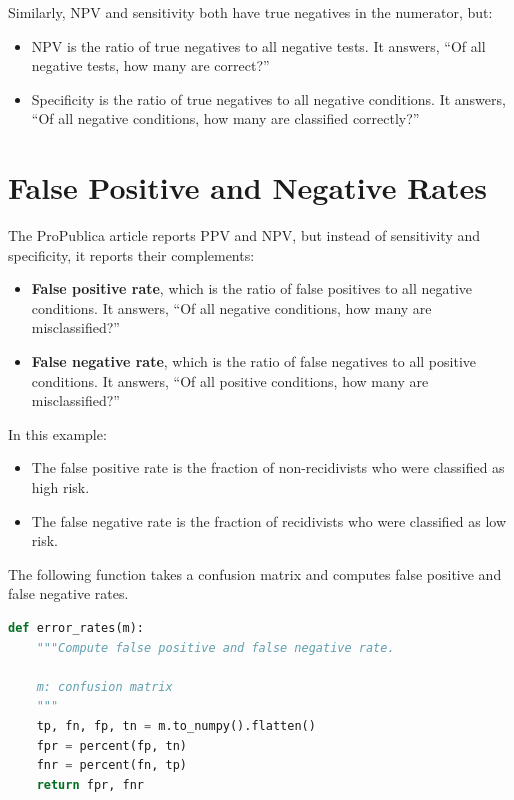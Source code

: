 Similarly, NPV and sensitivity both have true negatives in the
numerator, but:

\begin{itemize}
\item
  NPV is the ratio of true negatives to all negative tests. It answers,
  ``Of all negative tests, how many are correct?''
\item
  Specificity is the ratio of true negatives to all negative conditions.
  It answers, ``Of all negative conditions, how many are classified
  correctly?''
\end{itemize}

\section{False Positive and Negative
Rates}\label{false-positive-and-negative-rates}

The ProPublica article reports PPV and NPV, but instead of sensitivity
and specificity, it reports their complements:

\begin{itemize}
\item
  \textbf{False positive rate}, which is the ratio of false positives to
  all negative conditions. It answers, ``Of all negative conditions, how
  many are misclassified?''
\item
  \textbf{False negative rate}, which is the ratio of false negatives to
  all positive conditions. It answers, ``Of all positive conditions, how
  many are misclassified?''
\end{itemize}

In this example:

\begin{itemize}
\item
  The false positive rate is the fraction of non-recidivists who were
  classified as high risk.
\item
  The false negative rate is the fraction of recidivists who were
  classified as low risk.
\end{itemize}

The following function takes a confusion matrix and computes false
positive and false negative rates.

\begin{lstlisting}[language=Python,style=source]
def error_rates(m):
    """Compute false positive and false negative rate.

    m: confusion matrix
    """
    tp, fn, fp, tn = m.to_numpy().flatten()
    fpr = percent(fp, tn)
    fnr = percent(fn, tp)
    return fpr, fnr
\end{lstlisting}

